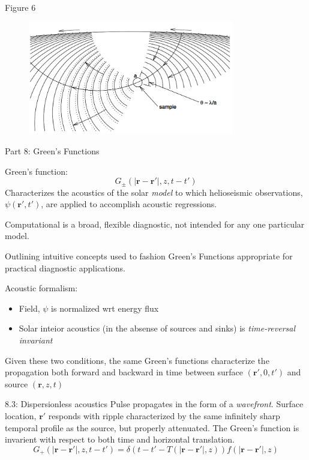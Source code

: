 \documentclass{beamer}
\begin{document}
\begin{frame}{Figure 6}
    \begin{figure}
        \includegraphics[width=0.8\textwidth]{fig_6.png}
    \end{figure}
\end{frame}

\begin{frame}{Part 8: Green's Functions}
\end{frame}

\begin{frame}{8.1}
    Green's function:
    $$ G_{\pm}(|\mathbf{r}-\mathbf{r}'|,z,t-t') $$
    Characterizes the acoustics of the solar \emph{model}
    to which helioseismic observations,
    $\psi(\mathbf{r}',t')$,
    are applied to accomplish acoustic regressions.

    Computational is a broad, flexible diagnostic,
    not intended for any one particular model.

    Outlining intuitive concepts used to fashion Green's Functions
    appropriate for practical diagnostic applications.
\end{frame}

\begin{frame}{8.2}
    Acoustic formalism:
    \begin{itemize}
        \item Field, $\psi$ is normalized wrt energy flux
        \item Solar inteior acoustics (in the absense of sources
            and sinks) is \emph{time-reversal invariant}
    \end{itemize}
    Given these two conditions, the same Green's functions characterize
    the propagation both forward and backward in time between surface
    $(\mathbf{r}',0,t')$ and source $(\mathbf{r},z,t)$
\end{frame}

\begin{frame}{8.3: Dispersionless acoustics}
    Pulse propagates in the form of a \emph{wavefront}.
    Surface location, $\mathbf{r}'$ responds with ripple characterized
    by the same infinitely sharp temporal profile as the source,
    but properly attenuated. The Green's function is invarient with
    respect to both time and horizontal translation.
    $$ G_{+}(|\mathbf{r}-\mathbf{r}'|,z,t-t') =
    \delta\left(t-t'-T\left(|\mathbf{r}-\mathbf{r}'|,z\right)\right)
       f\left(|\mathbf{r}-\mathbf{r}'|,z\right)$$
\end{frame}
\end{document}
